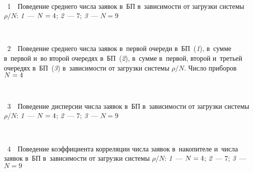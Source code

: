 \begin{multicols}{2}
\vspace*{6pt}

\begin{center}  %
\vspace*{2pt}
\mbox{%
 \epsfxsize=75.145mm
 }
\end{center}

\noindent
{{\figurename~1}\ \ \small{Поведение
 среднего числа заявок в~БП в~зависимости от загрузки
системы  $\rho/N$: \textit{1}~--- $N\hm=4$; \textit{2}~--- 7;
\textit{3}~--- $N=9$}}



\addtocounter{figure}{1}


\begin{center}  %
\vspace*{2pt}
 \mbox{%
 \epsfxsize=75.027mm
 }
 \end{center}

\noindent
{{\figurename~2}\ \ \small{Поведение среднего числа заявок в~первой
очереди в~БП~(\textit{1}), в~сумме в~первой и~во второй очередях в~БП~(\textit{2}),
в~сумме в~первой, второй и~третьей очередях в~БП~(\textit{3})
в~зависимости от загрузки системы $\rho/N$. Число
приборов $N\hm=4$}}

\vspace*{18pt}


\begin{center}  %
\vspace*{2pt}
 \mbox{%
 \epsfxsize=74.929mm
 }
 \end{center}

\noindent
{{\figurename~3}\ \ \small{Поведение
 дисперсии числа заявок в~БП в~зависимости от загрузки
системы  $\rho/N$: \textit{1}~--- $N\hm=4$; \textit{2}~--- 7; \textit{3}~--- $N=9$}}

\vspace*{18pt}

\begin{center}  %
\vspace*{2pt}
 \mbox{%
 \epsfxsize=75.192mm
 }
 \end{center}

\noindent
{{\figurename~4}\ \ \small{Поведение
 коэффициента корреляции числа заявок в~накопителе и~числа
заявок в~БП в~зависимости от загрузки системы  $\rho/N$:
\textit{1}~--- $N\hm=4$; \textit{2}~--- 7; \textit{3}~--- $N=9$}}





\end{multicols}
